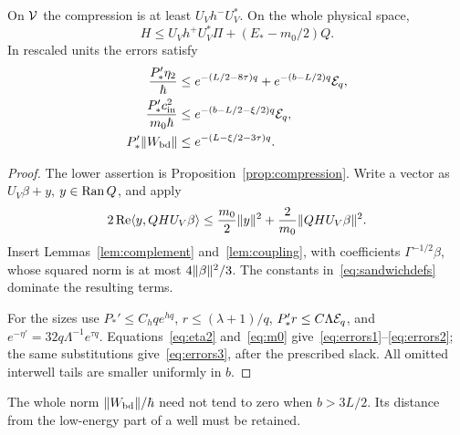 \begin{lemma}\label{lem:sandwich}
On $\mathcal V$ the compression is at least $U_Vh^-U_V^*$. On the whole physical space,
\begin{equation}\label{eq:sandwich}
 H\le U_Vh^+U_V^*\Pi+(E_*-m_0/2)Q.
\end{equation}
In rescaled units the errors satisfy
\begin{align}
 \frac{P_*'\eta_2}{\hbar}
 &\le e^{-(L/2-8\tau)q}+e^{-(b-L/2)q}\mathcal E_q,\label{eq:errors1}\\
 \frac{P_*'c_{\rm in}^2}{m_0\hbar}
 &\le e^{-(b-L/2-\xi/2)q}\mathcal E_q,\label{eq:errors2}\\
 P_*'\lVert W_{\rm bd}\rVert
 &\le e^{-(L-\xi/2-3\tau)q}.\label{eq:errors3}
\end{align}
\end{lemma}
\begin{proof}
The lower assertion is Proposition~\ref{prop:compression}. Write a vector as $U_V\beta+y$, $y\in\operatorname{Ran} Q$, and apply
\[
 2\operatorname{Re}\langle y,QHU_V\beta\rangle
 \le\frac{m_0}{2}\lVert y\rVert^2+\frac2{m_0}\lVert QHU_V\beta\rVert^2.
\]
Insert Lemmas~\ref{lem:complement} and~\ref{lem:coupling}, with coefficients $\Gamma^{-1/2}\beta$, whose squared norm is at most $4\lVert \beta\rVert^2/3$. The constants in~\eqref{eq:sandwichdefs} dominate the resulting terms.

For the sizes use $P_*'\le C_hqe^{hq}$, $r\le(\lambda+1)/q$, $P_*'r\le C\Lambda\mathcal E_q$, and
$e^{-\eta'}=32q\Lambda^{-1}e^{\tau q}$. Equations~\eqref{eq:eta2} and~\eqref{eq:m0} give~\eqref{eq:errors1}--\eqref{eq:errors2}; the same substitutions give~\eqref{eq:errors3}, after the prescribed slack. All omitted interwell tails are smaller uniformly in $b$.
\end{proof}

The whole norm $\lVert W_{\rm bd}\rVert/\hbar$ need not tend to zero when $b>3L/2$. Its distance from the low-energy part of a well must be retained.


